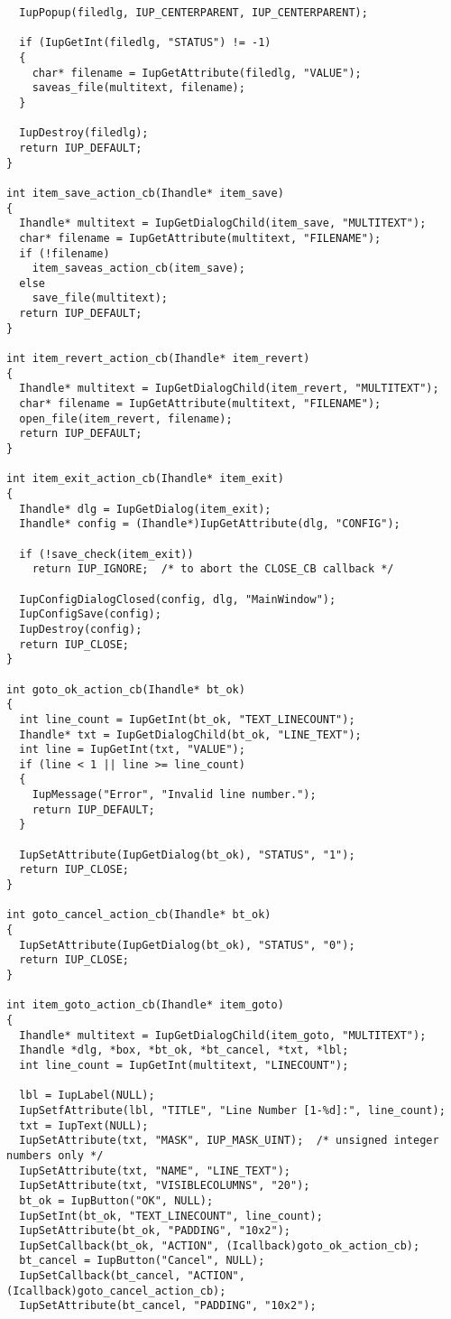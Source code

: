 \documentclass{ctexart}
\begin{document}
\begin{lstlisting}
  IupPopup(filedlg, IUP_CENTERPARENT, IUP_CENTERPARENT);

  if (IupGetInt(filedlg, "STATUS") != -1)
  {
    char* filename = IupGetAttribute(filedlg, "VALUE");
    saveas_file(multitext, filename);
  }

  IupDestroy(filedlg);
  return IUP_DEFAULT;
}

int item_save_action_cb(Ihandle* item_save)
{
  Ihandle* multitext = IupGetDialogChild(item_save, "MULTITEXT");
  char* filename = IupGetAttribute(multitext, "FILENAME");
  if (!filename)
    item_saveas_action_cb(item_save);
  else
    save_file(multitext);
  return IUP_DEFAULT;
}

int item_revert_action_cb(Ihandle* item_revert)
{
  Ihandle* multitext = IupGetDialogChild(item_revert, "MULTITEXT");
  char* filename = IupGetAttribute(multitext, "FILENAME");
  open_file(item_revert, filename);
  return IUP_DEFAULT;
}

int item_exit_action_cb(Ihandle* item_exit)
{
  Ihandle* dlg = IupGetDialog(item_exit);
  Ihandle* config = (Ihandle*)IupGetAttribute(dlg, "CONFIG");

  if (!save_check(item_exit))
    return IUP_IGNORE;  /* to abort the CLOSE_CB callback */

  IupConfigDialogClosed(config, dlg, "MainWindow");
  IupConfigSave(config);
  IupDestroy(config);
  return IUP_CLOSE;
}

int goto_ok_action_cb(Ihandle* bt_ok)
{
  int line_count = IupGetInt(bt_ok, "TEXT_LINECOUNT");
  Ihandle* txt = IupGetDialogChild(bt_ok, "LINE_TEXT");
  int line = IupGetInt(txt, "VALUE");
  if (line < 1 || line >= line_count)
  {
    IupMessage("Error", "Invalid line number.");
    return IUP_DEFAULT;
  }

  IupSetAttribute(IupGetDialog(bt_ok), "STATUS", "1");
  return IUP_CLOSE;
}

int goto_cancel_action_cb(Ihandle* bt_ok)
{
  IupSetAttribute(IupGetDialog(bt_ok), "STATUS", "0");
  return IUP_CLOSE;
}

int item_goto_action_cb(Ihandle* item_goto)
{
  Ihandle* multitext = IupGetDialogChild(item_goto, "MULTITEXT");
  Ihandle *dlg, *box, *bt_ok, *bt_cancel, *txt, *lbl;
  int line_count = IupGetInt(multitext, "LINECOUNT");

  lbl = IupLabel(NULL);
  IupSetfAttribute(lbl, "TITLE", "Line Number [1-%d]:", line_count);
  txt = IupText(NULL);
  IupSetAttribute(txt, "MASK", IUP_MASK_UINT);  /* unsigned integer numbers only */
  IupSetAttribute(txt, "NAME", "LINE_TEXT");
  IupSetAttribute(txt, "VISIBLECOLUMNS", "20");
  bt_ok = IupButton("OK", NULL);
  IupSetInt(bt_ok, "TEXT_LINECOUNT", line_count);
  IupSetAttribute(bt_ok, "PADDING", "10x2");
  IupSetCallback(bt_ok, "ACTION", (Icallback)goto_ok_action_cb);
  bt_cancel = IupButton("Cancel", NULL);
  IupSetCallback(bt_cancel, "ACTION", (Icallback)goto_cancel_action_cb);
  IupSetAttribute(bt_cancel, "PADDING", "10x2");


\end{lstlisting}
\end{document}
